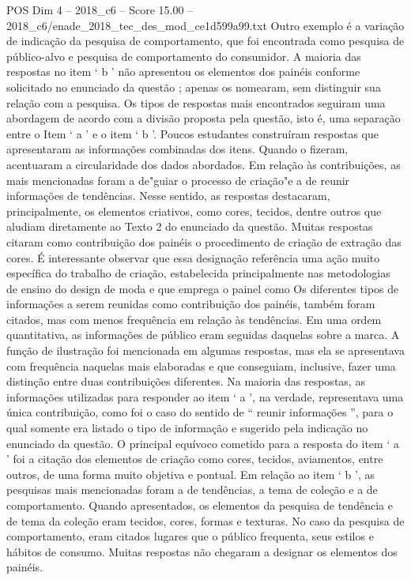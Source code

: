 \begin{textsample}{POS Dim 4 – 2018\_c6 – Score 15.00 – 2018\_c6/enade\_2018\_tec\_des\_mod\_ce1d599a99.txt}
Outro exemplo é a variação de indicação da pesquisa de comportamento, que foi encontrada como pesquisa de público-alvo e pesquisa de comportamento do consumidor.
A maioria das respostas no item ‘ b ’ não apresentou os elementos dos painéis conforme solicitado no enunciado da questão ; apenas os nomearam, sem distinguir sua relação com a pesquisa.
Os tipos de respostas mais encontrados seguiram uma abordagem de acordo com a divisão proposta pela questão, isto é, uma separação entre o Item ‘ a ’ e o item ‘ b ’.
Poucos estudantes construíram respostas que apresentaram as informações combinadas dos itens.
Quando o fizeram, acentuaram a circularidade dos dados abordados.
Em relação às contribuições, as mais mencionadas foram a de"guiar o processo de criação"e a de reunir informações de tendências.
Nesse sentido, as respostas destacaram, principalmente, os elementos criativos, como cores, tecidos, dentre outros que aludiam diretamente ao Texto 2 do enunciado da questão.
Muitas respostas citaram como contribuição dos painéis o procedimento de criação de extração das cores.
É interessante observar que essa designação referência uma ação muito específica do trabalho de criação, estabelecida principalmente nas metodologias de ensino do design de moda e que emprega o painel como Os diferentes tipos de informações a serem reunidas como contribuição dos painéis, também foram citados, mas com menos frequência em relação às tendências.
Em uma ordem quantitativa, as informações de público eram seguidas daquelas sobre a marca.
A função de ilustração foi mencionada em algumas respostas, mas ela se apresentava com frequência naquelas mais elaboradas e que conseguiam, inclusive, fazer uma distinção entre duas contribuições diferentes.
Na maioria das respostas, as informações utilizadas para responder ao item ‘ a ’, na verdade, representava uma única contribuição, como foi o caso do sentido de “ reunir informações ”, para o qual somente era listado o tipo de informação e sugerido pela indicação no enunciado da questão.
O principal equívoco cometido para a resposta do item ‘ a ’ foi a citação dos elementos de criação como cores, tecidos, aviamentos, entre outros, de uma forma muito objetiva e pontual.
Em relação ao item ‘ b ’, as pesquisas mais mencionadas foram a de tendências, a tema de coleção e a de comportamento.
Quando apresentados, os elementos da pesquisa de tendência e de tema da coleção eram tecidos, cores, formas e texturas.
No caso da pesquisa de comportamento, eram citados lugares que o público frequenta, seus estilos e hábitos de consumo.
Muitas respostas não chegaram a designar os elementos dos painéis.

\end{textsample}
